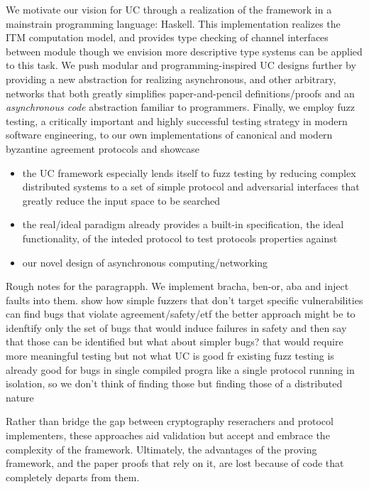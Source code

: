 We motivate our vision for UC through a realization of the framework in a mainstrain programming language: Haskell. 
This implementation realizes the ITM computation model, and provides type checking of channel interfaces between module though we envision more descriptive type systems can be applied to this task.
We push modular and programming-inspired UC designs further by providing a new abstraction for realizing asynchronous, and other arbitrary, networks that both greatly simplifies paper-and-pencil definitions/proofs and an \emph{asynchronous code} abstraction familiar to programmers.
Finally, we employ fuzz testing, a critically important and highly successful testing strategy in modern software engineering, to our own implementations of canonical and modern byzantine agreement protocols and showcase
\begin{itemize}
\item the UC framework especially lends itself to fuzz testing by reducing complex distributed systems to a set of simple protocol and adversarial interfaces that greatly reduce the input space to be searched
\item the real/ideal paradigm already provides a built-in specification, the ideal functionality, of the inteded protocol to test protocols properties against
\item our novel design of asynchronous computing/networking 
\end{itemize}

Rough notes for the paragrapph. 
We implement bracha, ben-or, aba and inject faults into them. show how simple fuzzers that don't target specific vulnerabilities can find bugs that violate agreement/safety/etf
the better approach might be to idenftify only the set of bugs that would induce failures in safety and then say that those can be identified
but what about simpler bugs? that would require more meaningful testing but not what UC is good fr
existing fuzz testing is already good for bugs in single compiled progra like a single protocol running in isolation, so we don't think of finding those
but finding those of a distributed nature


Rather than bridge the gap between cryptography reserachers and protocol implementers, these approaches aid validation but accept and embrace the complexity of the framework.
Ultimately, the advantages of the proving framework, and the paper proofs that rely on it, are lost because of code that completely departs from them. 




